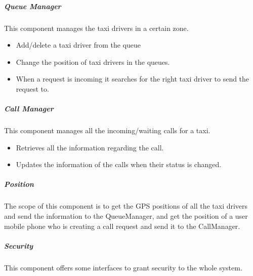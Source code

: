 \subparagraph{Queue Manager}
This component manages the taxi drivers in a certain zone.
\begin{itemize}
    \item Add/delete a taxi driver from the queue
    \item Change the position of taxi drivers in the queues.
    \item When a request is incoming it searches for the right taxi driver to send the request to.
\end{itemize}

\subparagraph{Call Manager}
This component manages all the incoming/waiting calls for a taxi.
\begin{itemize}
    \item Retrieves all the information regarding the call.
    \item Updates the information of the calls when their status is changed.
\end{itemize}

\subparagraph{Position}
The scope of this component is to get the GPS positions of all the taxi drivers and send the information to the QueueManager, and get the position of a user mobile phone who is creating a call request and send it to the CallManager.

\subparagraph{Security}
This component offers some interfaces to grant security to the whole system.
